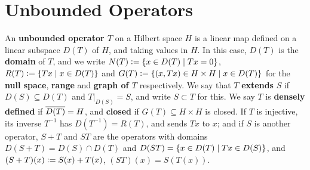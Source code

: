 \documentclass[10pt]{amsart}
\begin{document}

\section{Unbounded Operators}
An \textbf{unbounded operator $T$} on a Hilbert space $H$ is a linear map defined on a linear subspace $D(T)$ of $H$, and taking values in $H$. In this case, $D(T)$ is the \textbf{domain} of $T$, and we write $N(T) \vcentcolon= \left\{  x \in D(T) \mid Tx = 0  \right\}$, $R(T) \vcentcolon= \left\{  Tx \mid x \in D(T)  \right\}$ and $G(T) \vcentcolon= \left\{  (x, Tx) \in H \times H \mid x \in D(T)  \right\}$ for the \textbf{null space}, \textbf{range} and \textbf{graph of $T$} respectively. We say that $T$ \textbf{extends} $S$ if $D(S) \subseteq D(T)$ and $T|_{D(S)} = S$, and write $S \subset T$ for this. We say $T$ is \textbf{densely defined} if $\overline{D(T)} = H$, and \textbf{closed} if $G(T) \subseteq H \times H$ is closed. If $T$ is injective, its inverse $T^{-1}$ has $D(T^{-1}) = R(T)$, and sends $Tx$ to $x$; and if $S$ is another operator, $S + T$ and $ST$ are the operators with domains $D(S + T) = D(S) \cap D(T)$ and $D(ST) = \left\{  x \in D(T) \mid Tx \in D(S)  \right\}$, and $(S + T)(x) \vcentcolon= S(x) + T(x)$, $(ST)(x) = S(T(x))$.
\end{document}
